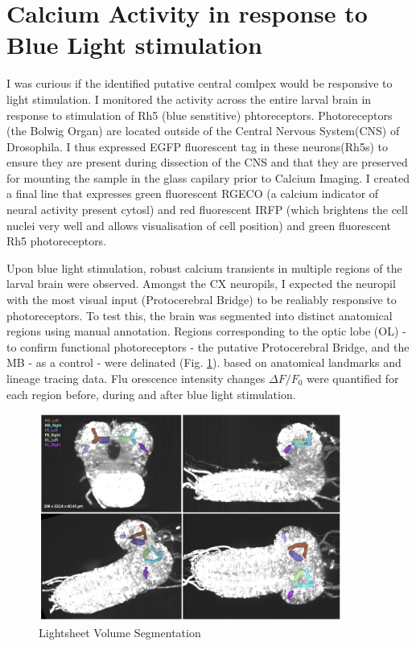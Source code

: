 \section{Calcium Activity in response to Blue Light stimulation}
I was curious if the identified putative central comlpex would be responsive to light stimulation. 
I monitored the activity across the entire larval brain in response to stimulation of Rh5 (blue senstitive) phtoreceptors. Photoreceptors (the Bolwig Organ) are located outside of the Central Nervous System(CNS) of Drosophila. I thus expressed EGFP fluorescent tag in these neurons(Rh5s) to ensure they are present during dissection of the CNS and that they are preserved for mounting the sample in the glass capilary prior to Calcium Imaging. I created a final line that expresses green fluorescent RGECO (a calcium indicator of neural activity present cytosl) and red fluorescent IRFP (which brightens the cell nuclei very well and allows visualisation of cell position) and green fluorescent Rh5 photoreceptors. 

Upon blue light stimulation, robust calcium transients in multiple regions of the larval brain were observed. Amongst the CX neuropils, I expected the neuropil with the most visual input (Protocerebral Bridge) to be realiably responsive to photoreceptors. To test this, the brain was segmented into distinct anatomical regions using manual annotation. Regions corresponding to the optic lobe (OL) - to confirm functional photoreceptors - the putative Protocerebral Bridge, and the MB - as a control -  were delinated (Fig. \ref{LSSegmentation}).
based on anatomical landmarks and lineage tracing data. Flu orescence intensity changes $\Delta F/F_0$ were quantified for each region before, during and after blue light stimulation. 

   \begin{figure}
        \centering
        \includegraphics[width=10cm]{Figs/CX/LSSegmentation.pdf}
        \caption[Lightsheet volume Segmentation]{Lightsheet Volume Segmentation}
        \label{LSSegmentation}
    \end{figure}

